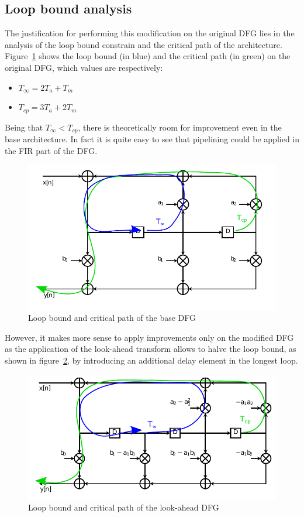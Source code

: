 \documentclass[a4paper]{article}
\begin{document}
\subsection{Loop bound analysis}
The justification for performing this modification on the original DFG lies in the analysis of the loop bound constrain and the critical path of the architecture. Figure~\ref{fig:base_dfg_lbcp} shows the loop bound (in blue) and the critical path (in green) on the original DFG, which values are respectively:
\begin{itemize}
    \item $T_\infty = 2T_a + T_m$
    \item $T_{cp} = 3T_a + 2T_m$
\end{itemize}
Being that $T_\infty < T_{cp}$, there is theoretically room for improvement even in the base architecture. In fact it is quite easy to see that pipelining could be applied in the FIR part of the DFG.

\begin{figure}[hbtp]
    \centering
    \includegraphics[width=.8\linewidth]{media/base_dfg_lbcp.pdf}
    \caption{Loop bound and critical path of the base DFG}
    \label{fig:base_dfg_lbcp}
\end{figure}

However, it makes more sense to apply improvements only on the modified DFG as the application of the look-ahead transform allows to halve the loop bound, as shown in figure~\ref{fig:lookahead_dfg_lbcp}, by introducing an additional delay element in the longest loop. 

\begin{figure}[hbtp]
    \centering
    \includegraphics[width=.9\linewidth]{media/lookahead_dfg_lbcp.pdf}
    \caption{Loop bound and critical path of the look-ahead DFG}
    \label{fig:lookahead_dfg_lbcp}
\end{figure}
\end{document}
